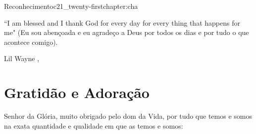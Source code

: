 \begin{chapterpage}{Reconhecimento}{c21_twenty-firstchapter:cha}

\begin{myquotation}``I am blessed and I thank God for every day for every thing that happens for me" (Eu sou abençoada e eu agradeço a Deus por todos os dias e por tudo o que acontece comigo).


 
\par\vspace*{15mm}
\mbox{}\hfill \emdash{}Lil Wayne 
, %
\par\end{myquotation}

\end{chapterpage}



\section{Gratidão e Adoração}\label{c1_basicformatting:sec}

\emdash{}Senhor da Glória, muito obrigado pelo dom da Vida, por tudo que temos e somos na exata quantidade e qualidade em que as temos e somos:

